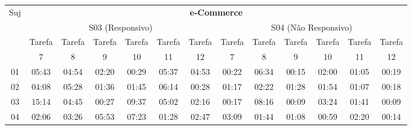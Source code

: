 \footnotesize%
\begin{center}
\begin{sideways}
\begin{tabular}{|l|l|l|l|l|l|l|l|l|l|l|l|l|}
\hline
Suj & \multicolumn{12}{c|}{\textbf{e-Commerce}} \\ 
\cline{2-13}
 & \multicolumn{6}{c|}{S03 (Responsivo)} & \multicolumn{6}{c|}{S04 (Não Responsivo)} \\ 
\cline{2-13}
 & \multicolumn{1}{c|}{Tarefa} & Tarefa & Tarefa & Tarefa & Tarefa & Tarefa & Tarefa & Tarefa & Tarefa & Tarefa & Tarefa & Tarefa \\ 
 & \multicolumn{1}{c|}{7} & \multicolumn{1}{c|}{8} & \multicolumn{1}{c|}{9} & \multicolumn{1}{c|}{10} & \multicolumn{1}{c|}{11} & \multicolumn{1}{c|}{12} & \multicolumn{1}{c|}{7} & \multicolumn{1}{c|}{8} & \multicolumn{1}{c|}{9} & \multicolumn{1}{c|}{10} & \multicolumn{1}{c|}{11} & \multicolumn{1}{c|}{12} \\ 
\hline
\multicolumn{1}{|c|}{01} & \multicolumn{1}{c|}{05:43} & \multicolumn{1}{c|}{04:54} & \multicolumn{1}{c|}{02:20} & \multicolumn{1}{c|}{00:29} & \multicolumn{1}{c|}{05:37} & \multicolumn{1}{c|}{04:53} & \multicolumn{1}{c|}{00:22} & \multicolumn{1}{c|}{06:34} & \multicolumn{1}{c|}{00:15} & \multicolumn{1}{c|}{02:00} & \multicolumn{1}{c|}{01:05} & \multicolumn{1}{c|}{00:19} \\ 
\hline
\multicolumn{1}{|c|}{02} & \multicolumn{1}{c|}{04:08} & \multicolumn{1}{c|}{05:28} & \multicolumn{1}{c|}{01:36} & \multicolumn{1}{c|}{01:45} & \multicolumn{1}{c|}{06:14} & \multicolumn{1}{c|}{00:28} & \multicolumn{1}{c|}{01:17} & \multicolumn{1}{c|}{02:22} & \multicolumn{1}{c|}{01:28} & \multicolumn{1}{c|}{01:54} & \multicolumn{1}{c|}{01:07} & \multicolumn{1}{c|}{00:18} \\ 
\hline
\multicolumn{1}{|c|}{03} & \multicolumn{1}{c|}{15:14} & \multicolumn{1}{c|}{04:45} & \multicolumn{1}{c|}{00:27} & \multicolumn{1}{c|}{09:37} & \multicolumn{1}{c|}{05:02} & \multicolumn{1}{c|}{02:16} & \multicolumn{1}{c|}{00:17} & \multicolumn{1}{c|}{08:16} & \multicolumn{1}{c|}{00:09} & \multicolumn{1}{c|}{03:24} & \multicolumn{1}{c|}{01:41} & \multicolumn{1}{c|}{00:09} \\ 
\hline
\multicolumn{1}{|c|}{04} & \multicolumn{1}{c|}{02:06} & \multicolumn{1}{c|}{03:26} & \multicolumn{1}{c|}{05:53} & \multicolumn{1}{c|}{07:23} & \multicolumn{1}{c|}{01:28} & \multicolumn{1}{c|}{02:47} & \multicolumn{1}{c|}{03:09} & \multicolumn{1}{c|}{01:44} & \multicolumn{1}{c|}{01:08} & \multicolumn{1}{c|}{00:59} & \multicolumn{1}{c|}{02:20} & \multicolumn{1}{c|}{00:14} \\ 

\end{tabular}
\end{sideways}
\end{center}
